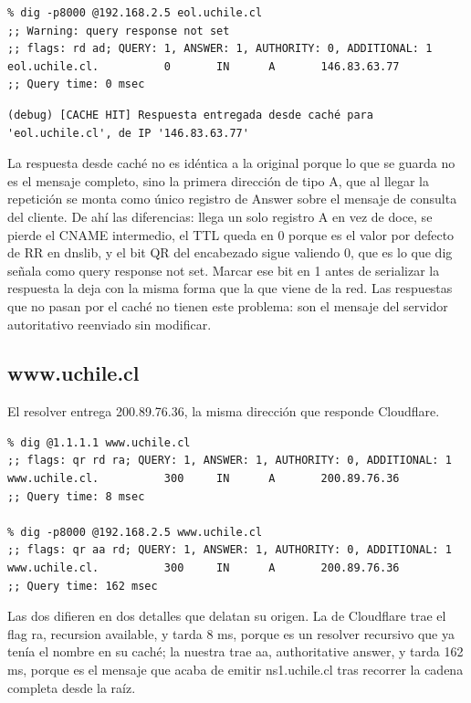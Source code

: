 \documentclass[
	spanish, %
	letterpaper, oneside
]{article}
\begin{document}
\begin{verbatim}
% dig -p8000 @192.168.2.5 eol.uchile.cl
;; Warning: query response not set
;; flags: rd ad; QUERY: 1, ANSWER: 1, AUTHORITY: 0, ADDITIONAL: 1
eol.uchile.cl.          0       IN      A       146.83.63.77
;; Query time: 0 msec
\end{verbatim}

{\scriptsize
\begin{verbatim}
(debug) [CACHE HIT] Respuesta entregada desde caché para 'eol.uchile.cl', de IP '146.83.63.77'
\end{verbatim}
}

La respuesta desde caché no es idéntica a la original porque lo que se guarda no es el mensaje completo, sino la primera dirección de tipo A, que al llegar la repetición se monta como único registro de Answer sobre el mensaje de consulta del cliente. De ahí las diferencias: llega un solo registro A en vez de doce, se pierde el CNAME intermedio, el TTL queda en 0 porque es el valor por defecto de RR en dnslib, y el bit QR del encabezado sigue valiendo 0, que es lo que dig señala como query response not set. Marcar ese bit en 1 antes de serializar la respuesta la deja con la misma forma que la que viene de la red. Las respuestas que no pasan por el caché no tienen este problema: son el mensaje del servidor autoritativo reenviado sin modificar.

\subsection{www.uchile.cl}
El resolver entrega 200.89.76.36, la misma dirección que responde Cloudflare.

\begin{verbatim}
% dig @1.1.1.1 www.uchile.cl
;; flags: qr rd ra; QUERY: 1, ANSWER: 1, AUTHORITY: 0, ADDITIONAL: 1
www.uchile.cl.          300     IN      A       200.89.76.36
;; Query time: 8 msec

% dig -p8000 @192.168.2.5 www.uchile.cl
;; flags: qr aa rd; QUERY: 1, ANSWER: 1, AUTHORITY: 0, ADDITIONAL: 1
www.uchile.cl.          300     IN      A       200.89.76.36
;; Query time: 162 msec
\end{verbatim}

Las dos difieren en dos detalles que delatan su origen. La de Cloudflare trae el flag ra, recursion available, y tarda 8 ms, porque es un resolver recursivo que ya tenía el nombre en su caché; la nuestra trae aa, authoritative answer, y tarda 162 ms, porque es el mensaje que acaba de emitir ns1.uchile.cl tras recorrer la cadena completa desde la raíz.
\end{document}
